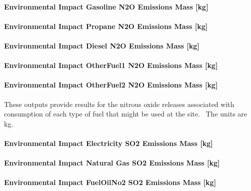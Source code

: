 \paragraph{Environmental Impact Gasoline N2O Emissions Mass {[}kg{]}}\label{environmental-impact-gasoline-n2o-emissions-mass-kg}

\paragraph{Environmental Impact Propane N2O Emissions Mass {[}kg{]}}\label{environmental-impact-propane-n2o-emissions-mass-kg}

\paragraph{Environmental Impact Diesel N2O Emissions Mass {[}kg{]}}\label{environmental-impact-diesel-n2o-emissions-mass-kg}

\paragraph{Environmental Impact OtherFuel1 N2O Emissions Mass {[}kg{]}}\label{environmental-impact-otherfuel1-n2o-emissions-mass-kg}

\paragraph{Environmental Impact OtherFuel2 N2O Emissions Mass {[}kg{]}}\label{environmental-impact-otherfuel2-n2o-emissions-mass-kg}

These outputs provide results for the nitrous oxide releases associated with consumption of each type of fuel that might be used at the site.~ The units are kg.

\paragraph{Environmental Impact Electricity SO2 Emissions Mass {[}kg{]}}\label{environmental-impact-electricity-so2-emissions-mass-kg}

\paragraph{Environmental Impact Natural Gas SO2 Emissions Mass {[}kg{]}}\label{environmental-impact-natural-gas-so2-emissions-mass-kg}

\paragraph{Environmental Impact FuelOilNo2 SO2 Emissions Mass {[}kg{]}}\label{environmental-impact-fuel-oil-2-so2-emissions-mass-kg}

